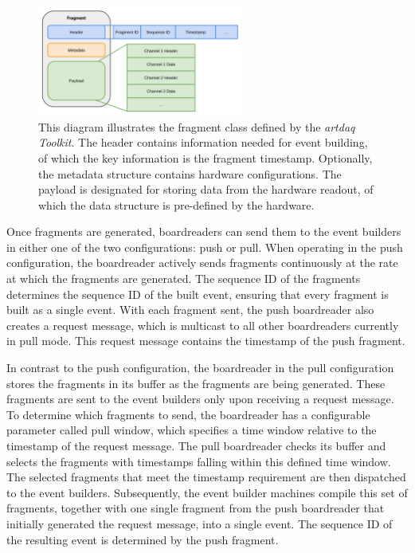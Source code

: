 \begin{figure}[htbp!] 
\centering    
\includegraphics[width=0.6\textwidth]{Fragment_Diagram}
\caption[FragmentDiagram]{This diagram illustrates the fragment class defined by the \textit{artdaq Toolkit}. The header contains information needed for event building, of which the key information is the fragment timestamp. Optionally, the metadata structure contains hardware configurations. The payload is designated for storing data from the hardware readout, of which the data structure is pre-defined by the hardware. }
\label{fig:fragmentDiagram}
\end{figure}

Once fragments are generated, boardreaders can send them to the event builders in either one of the two configurations: push or pull. 
When operating in the push configuration, the boardreader actively sends fragments continuously at the rate at which the fragments are generated.
The sequence ID of the fragments determines the sequence ID of the built event, ensuring  that every fragment is built as a single event.
With each fragment sent, the push boardreader also creates a request message, which is multicast to all other boardreaders currently in pull mode.
This request message contains the timestamp of the push fragment. 

In contrast to the push configuration, the boardreader in the pull configuration stores the fragments in its buffer as the fragments are being generated.
These fragments are sent to the event builders only upon receiving a request message.
To determine which fragments to send, the boardreader has a configurable parameter called pull window, which specifies a time window relative to the timestamp of the request message.
The pull boardreader checks its buffer and selects the fragments with timestamps falling within this defined time window.
The selected fragments that meet the timestamp requirement are then dispatched to the event builders.
Subsequently, the event builder machines compile this set of fragments, together with one single fragment from the push boardreader that initially generated the request message, into a single event.
The sequence ID of the resulting event is determined by the push fragment.

